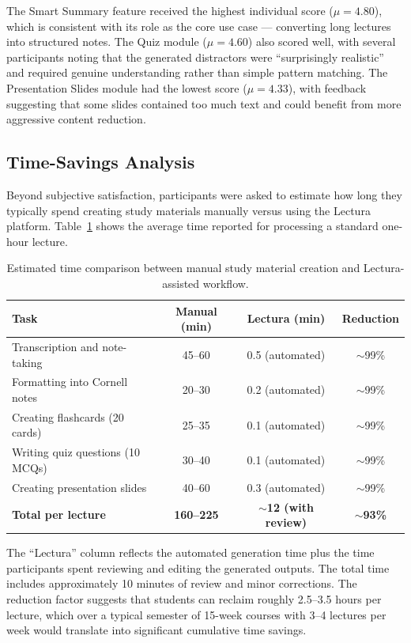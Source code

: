 The Smart Summary feature received the highest individual score ($\mu = 4.80$), which is consistent with its role as the core use case — converting long lectures into structured notes. The Quiz module ($\mu = 4.60$) also scored well, with several participants noting that the generated distractors were ``surprisingly realistic'' and required genuine understanding rather than simple pattern matching. The Presentation Slides module had the lowest score ($\mu = 4.33$), with feedback suggesting that some slides contained too much text and could benefit from more aggressive content reduction.

\subsection{Time-Savings Analysis}
Beyond subjective satisfaction, participants were asked to estimate how long they typically spend creating study materials manually versus using the Lectura platform. Table~\ref{tab:time_comparison} shows the average time reported for processing a standard one-hour lecture.

\begin{table}[htbp]
\centering
\begin{tabular}{|l|c|c|c|}
\hline
\textbf{Task} & \textbf{Manual (min)} & \textbf{Lectura (min)} & \textbf{Reduction} \\ \hline
Transcription and note-taking & 45--60 & 0.5 (automated) & $\sim$99\% \\ \hline
Formatting into Cornell notes & 20--30 & 0.2 (automated) & $\sim$99\% \\ \hline
Creating flashcards (20 cards) & 25--35 & 0.1 (automated) & $\sim$99\% \\ \hline
Writing quiz questions (10 MCQs) & 30--40 & 0.1 (automated) & $\sim$99\% \\ \hline
Creating presentation slides & 40--60 & 0.3 (automated) & $\sim$99\% \\ \hline
\textbf{Total per lecture} & \textbf{160--225} & \textbf{$\sim$12 (with review)} & \textbf{$\sim$93\%} \\ \hline
\end{tabular}
\vspace{6pt}
\caption{Estimated time comparison between manual study material creation and Lectura-assisted workflow.}
\label{tab:time_comparison}
\end{table}

The ``Lectura'' column reflects the automated generation time plus the time participants spent reviewing and editing the generated outputs. The total time includes approximately 10 minutes of review and minor corrections. The reduction factor suggests that students can reclaim roughly 2.5--3.5 hours per lecture, which over a typical semester of 15-week courses with 3--4 lectures per week would translate into significant cumulative time savings.

